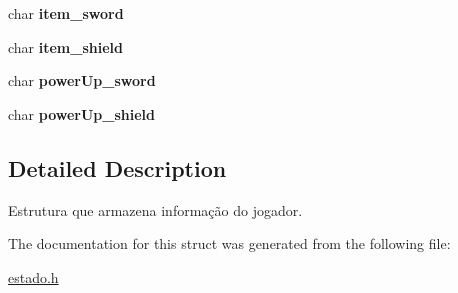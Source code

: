 \begin{DoxyCompactItemize}
\item 
char {\bfseries item\+\_\+sword}\hypertarget{structplayerState_af40c994255ce3468e9e10d28e72695d1}{}\label{structplayerState_af40c994255ce3468e9e10d28e72695d1}

\item 
char {\bfseries item\+\_\+shield}\hypertarget{structplayerState_a1018720970139637d117df31f7d4dd29}{}\label{structplayerState_a1018720970139637d117df31f7d4dd29}

\item 
char {\bfseries power\+Up\+\_\+sword}\hypertarget{structplayerState_aeb6a2ff9056c0fa02cee9cec4525218d}{}\label{structplayerState_aeb6a2ff9056c0fa02cee9cec4525218d}

\item 
char {\bfseries power\+Up\+\_\+shield}\hypertarget{structplayerState_a6b82f2a1a55915328bfca30d425cc7de}{}\label{structplayerState_a6b82f2a1a55915328bfca30d425cc7de}

\end{DoxyCompactItemize}


\subsection{Detailed Description}
Estrutura que armazena informação do jogador. 

The documentation for this struct was generated from the following file\+:\begin{DoxyCompactItemize}
\item 
\hyperlink{estado_8h}{estado.\+h}\end{DoxyCompactItemize}
